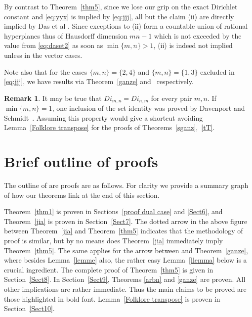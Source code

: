 \documentclass[10pt]{amsart}
\theoremstyle{definition}
\newtheorem{remark}{Remark}
\begin{document}
 By contrast to Theorem~\ref{thm5}, since we lose our grip on the exact Dirichlet constant and \eqref{eq:yyx} is implied by \eqref{eq:jjj}, all but the claim (ii)
are directly implied by Das et al \cite{Dasetal}. Since exceptions to (ii) form a countable union of rational hyperplanes thus of Hausdorff dimension $mn-1$ which is not exceeded by
the value from
\eqref{eq:daset2} as soon as $\min\{ m,n\}>1$,
(ii) is indeed not implied unless in the vector cases.

Note also that for the cases $\{m,n\}= \{2,4\}$ and $\{m,n\}=\{1,3\}$ excluded in \eqref{eq:jjj}, we have results via Theorem~\ref{ganze} and~\cite{j1, j2} respectively. 



\begin{remark}
    It may be true that $Di_{m,n}=Di_{n,m}$ for every pair $m,n$. If $\min\{m,n\}=1$, one inclusion of the set identity was proved by Davenport and Schmidt~\cite{dav}. 
    Assuming this property would give a shortcut avoiding Lemma~\ref{Folklore transpose} for the proofs of Theorems~\ref{sganz},~\ref{tT}. 
\end{remark}


\section{Brief outline of proofs} \label{outline}
The outline of are proofs are as follows. For clarity we provide a summary graph of how our theorems link at the end of this section.






Theorem~\ref{thm1} is proven in Sections~\ref{proof dual case} and \ref{Sect6}, and Theorem~\ref{jia} is proven in Section~\ref{Sect7}. The dotted arrow in the above figure between Theorem~\ref{jia} and Theorem~\ref{thm5} indicates that the methodology of proof is similar, but by no means does Theorem~\ref{jia} immediately imply Theorem~\ref{thm5}. The same applies for the arrow between \cite[Theorem 2.2]{j1} and Theorem~\ref{ganze}, where besides Lemma~\ref{lemme}
also, the rather easy Lemma~\ref{llemma} below is a crucial ingredient.
The complete proof of Theorem~\ref{thm5} is given in Section~\ref{Sect8}. In Section~\ref{Sect9}, Theorems \ref{arbn} and \ref{ganze} are proven. All other implications are rather immediate.
Thus the main claims to be proved are those highlighted in bold font.
Lemma~\ref{Folklore transpose} is proven in Section~\ref{Sect10}. \par 
\end{document}
